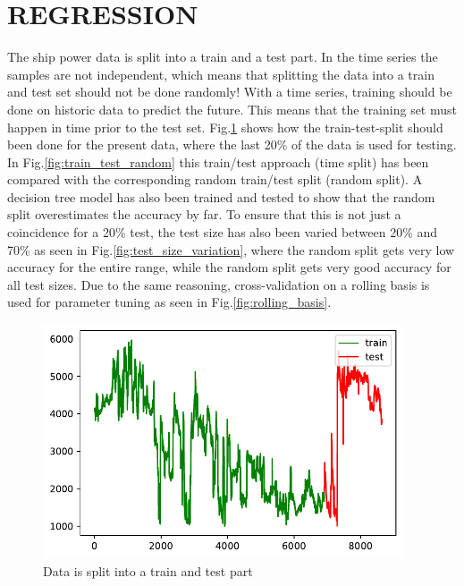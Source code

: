 \section*{REGRESSION}\label{regression}
The ship power data is split into a train and a test part. In the time
series the samples are not independent, which means that splitting the
data into a train and test set should not be done randomly! With a time
series, training should be done on historic data to predict the future.
This means that the training set must happen in time prior to the test
set. Fig.\ref{fig:train_test} shows how the train-test-split
should been done for the present data, where the last 20\% of the data
is used for testing.
In Fig.\ref{fig:train_test_random} this train/test approach
(time split) has been compared with the corresponding random train/test
split (random split). A decision tree model has also been trained and
tested to show that the random split overestimates the accuracy by far.
To ensure that this is not just a coincidence for a 20\% test, the test
size has also been varied between 20\% and 70\% as seen in
Fig.\ref{fig:test_size_variation}, where the random split gets
very low accuracy for the entire range, while the random split gets very
good accuracy for all test sizes.
Due to the same reasoning, cross-validation on a rolling basis is used
for parameter tuning as seen in Fig.\ref{fig:rolling_basis}.
\begin{figure}[H]
\begin{center}\includegraphics[width = 0.95\textwidth]{figures/train_test.pdf}\end{center}
\vspace{-0.7cm}
\caption{Data is split into a train and test part}
\label{fig:train_test}
\end{figure}
